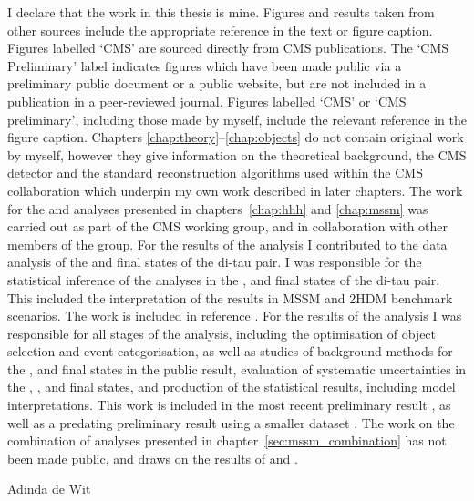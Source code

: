 \begin{declaration}
  I declare that the work in this thesis is mine. Figures and results taken from other sources
include the appropriate reference in the text or figure caption. Figures labelled `CMS' are sourced
directly from CMS publications. The `CMS Preliminary' label indicates figures which
have been made public via a preliminary public document or a public website, but are not
included in a publication in a peer-reviewed journal. Figures labelled `CMS' or `CMS preliminary', 
including those made by myself, include the relevant reference in the figure caption.
Chapters \ref{chap:theory}--\ref{chap:objects} do not contain original work by myself, however they 
give information on the theoretical background, the CMS detector and the standard reconstruction algorithms
used within the CMS collaboration which underpin my own work described in later chapters.
The work for the \Htohhtobbtautau and \AHtotautau analyses presented in chapters~\ref{chap:hhh} and \ref{chap:mssm} was 
carried out as part of the CMS \Htotautau working group, and in collaboration with other members of the group.
For the results of the \Htohhtobbtautau analysis I contributed to the data analysis of the \etau and \mutau
final states of the di-tau pair. I 
was responsible for the statistical inference of the analyses in the \etau, \mutau and \tautau final states
of the di-tau pair. This included
the interpretation of the results in MSSM and 2HDM benchmark scenarios. The 
work is included in reference \cite{CMS-HIG-14-034}. For the results of the \AHtotautau analysis
I was responsible for all stages of the analysis, including the optimisation
of object selection and event categorisation, as well as studies of background
methods for the \etau, \mutau and \tautau final states in the public result,
evaluation of systematic uncertainties in the \etau, \mutau, \tautau and \emu final states, and production of the statistical
results, including model interpretations. This work is included in the most recent
preliminary result \cite{CMS-PAS-HIG-16-037}, as well as a predating preliminary
result using a smaller dataset \cite{CMS-PAS-HIG-16-006}.
The work on the combination of \AHtotautau analyses presented in chapter~\ref{sec:mssm_combination} has
not been made public, and draws on the results of \cite{CMS-PAS-HIG-16-037} and \cite{CMS-PAS-HIG-16-006}.
\enlargethispage{2\baselineskip}

  \begin{flushright}
  Adinda de Wit
  \end{flushright}
\end{declaration}


